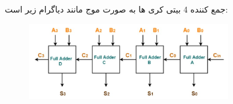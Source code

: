 \documentclass[20pt, a4paper]{article}
\begin{document}
\subsection{}
جمع کننده 4 بیتی کری ها به صورت موج مانند دیاگرام زیر است:
\begin{figure}[htbp]\centering
	\centerline{\includegraphics[width=250pt]{img/lastest/4bitRippleCarryAdder.jpg}}
\end{figure}









\end{document}
